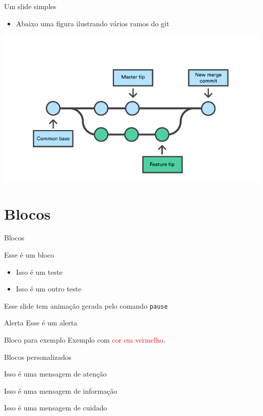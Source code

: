 \documentclass{beamer}
\begin{document}
\begin{frame}[wide]{Um slide simples}
\begin{itemize}
    \item Abaixo uma figura ilustrando vários ramos do git
\end{itemize}
\begin{center}
    \includegraphics[width=.8\linewidth]{figs/git-branch}
\end{center}
\end{frame}


\section{Blocos}


\begin{frame}{Blocos}
	\begin{block}{Esse é um bloco}
    \begin{itemize}
        \item Isso é um teste
        \item Isso é um outro teste
    \end{itemize}
	\end{block}

	\begin{block}{}
	    Esse slide tem animação gerada pelo comando \texttt{pause}
	\end{block}

    \pause

	\begin{alertblock}{Alerta}
        Esse é um alerta
	\end{alertblock}

	\begin{exampleblock}{Bloco para exemplo}
        Exemplo com \textcolor{red}{cor em vermelho}.
    \end{exampleblock}

\end{frame}


\begin{frame}[wide]{Blocos personalizados}
    \begin{atencao}
        Isso é uma mensagem de atenção
    \end{atencao}
    \begin{informacao}
        Isso é uma mensagem de informação
    \end{informacao}
    \begin{cuidado}
        Isso é uma mensagem de cuidado
    \end{cuidado}
    
    \end{frame}
\end{document}
